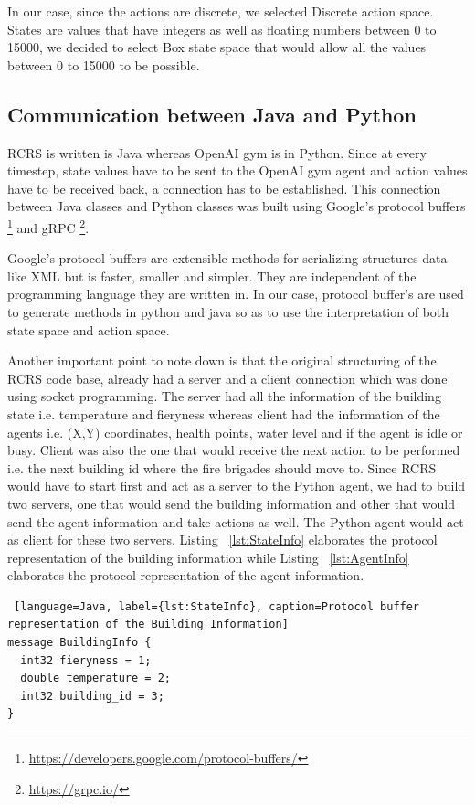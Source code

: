 \documentclass[12pt]{report}
\begin{document}
In our case, since the actions are discrete, we selected Discrete action space. States are values that have integers as well as floating numbers between 0 to 15000, we decided to select Box state space that would allow all the values between 0 to 15000 to be possible. 

\subsection{Communication between Java and Python} \label{CommunicationJavaPython}

RCRS is written is Java whereas OpenAI gym is in Python. Since at every timestep, state values have to be sent to the OpenAI gym agent and action values have to be received back, a connection has to be established. This connection between Java classes and Python classes was built using Google's protocol buffers \footnote{\url{https://developers.google.com/protocol-buffers/}}  and gRPC \footnote{\url{https://grpc.io/}}. 

Google's protocol buffers are extensible methods for serializing structures data like XML but is faster, smaller and simpler. They are independent of the programming language they are written in. In our case, protocol buffer's are used to generate methods in python and java so as to use the interpretation of both state space and action space. 

Another important point to note down is that the original structuring of the RCRS code base, already had a server and a client connection which was done using socket programming. The server had all the information of the building state i.e. temperature and fieryness whereas client had the information of the agents i.e. (X,Y) coordinates, health points, water level and if the agent is idle or busy. Client was also the one that would receive the next action to be performed i.e. the next building id where the fire brigades should move to. Since RCRS would have to start first and act as a server to the Python agent, we had to build two servers, one that would send the building information and other that would send the agent information and take actions as well. The Python agent would act as client for these two servers. Listing ~\ref{lst:StateInfo} elaborates the protocol representation of the building information while Listing ~\ref{lst:AgentInfo} elaborates the protocol representation of the agent information. 

\begin{lstlisting} [language=Java, label={lst:StateInfo}, caption=Protocol buffer representation of the Building Information] 
message BuildingInfo {
  int32 fieryness = 1;
  double temperature = 2;
  int32 building_id = 3;
}
\end{lstlisting}
\end{document}
